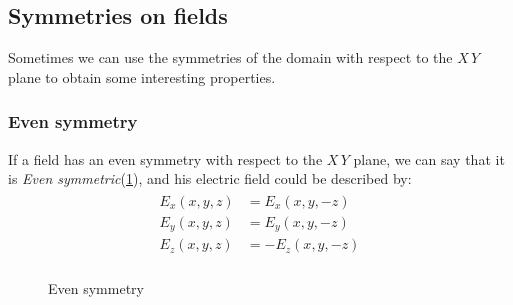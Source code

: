 \subsection{Symmetries on fields}
Sometimes we can use the symmetries of the domain with respect to the $X\,Y$ plane to obtain some interesting properties.
\subsubsection*{Even symmetry}
If a field has an even symmetry with respect to the $X\,Y$ plane, we can say that it is \emph{Even symmetric}(\cref{fig:even_sym}), and his electric field could be described by:
\begin{align}
    \begin{split}
        E_x(x,y,z)&=E_x(x,y,-z)\\[5pt]
        E_y(x,y,z)&=E_y(x,y,-z)\\[5pt]
        E_z(x,y,z)&=-E_z(x,y,-z)\\[5pt]
    \end{split}
\end{align}
\begin{figure}[H]
    \begin{center}
        \caption{Even symmetry}\label{fig:even_sym} 
    \end{center}
\end{figure}
